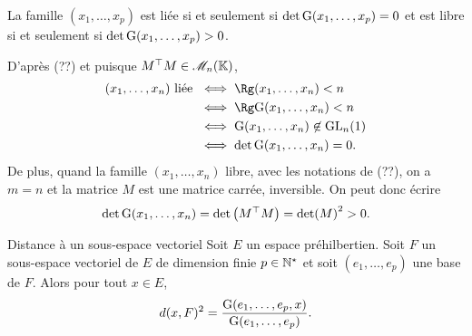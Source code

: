 \begin{prop}{}
     La famille $(x_1, \dots, x_p)$ est liée si et seulement si $\det \mathrm{G}(x_1, \dots, x_p) = 0$ et est libre si et seulement si $\det \mathrm{G}(x_1, \dots, x_p) > 0$.
\end{prop}

\begin{preuve}
    D'après (??) et puisque $M^\top M \in \mathscr{M}_n(\mathbb{K})$,
    \begin{align*}
        (x_1, \dots, x_n) \text{ liée } &\iff \Rg (x_1, \dots, x_n) < n \\
        &\iff \Rg \Gram(x_1, \dots, x_n) < n \\
        &\iff \Gram(x_1, \dots, x_n) \not \in \Gl_n(\R) \\
        &\iff \det \Gram(x_1, \dots, x_n) = 0.
    \end{align*}
    De plus, quand la famille $(x_1, \dots, x_n)$ libre, avec les notations de (??), on a $m=n$ et la matrice $M$ est une matrice carrée, inversible. On peut donc écrire
    $$\det \mathrm{G}(x_1, \dots, x_n) = \det \big( M^\top M \big) = \det(M)^2 > 0.$$
\end{preuve}

\begin{theo}{Distance à un sous-espace vectoriel} 
    Soit $E$ un espace préhilbertien. Soit $F$ un sous-espace vectoriel de $E$ de dimension finie $p \in \mathbb{N}^\star$ et soit $(e_1, \dots, e_p)$ une base de $F$. Alors pour tout $x \in E$,
    $$d(x, F)^2 = \frac{\mathrm{G}(e_1, \dots, e_p, x)}{\mathrm{G}(e_1, \dots, e_p)}.$$
\end{theo}

